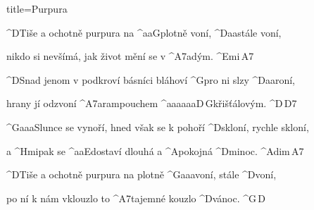 \begin{song}{title=\predtitle\centering Purpura \\\large   \vspace*{-0.3cm}}  %
\begin{centerjustified}
\nejnejvetsi

\sloka
	^{D}Tiše a ochotně purpura na ^{{\color{white}aa}G}plotně voní, ^{D{\color{white}aa}}stále voní,

	nikdo si nevšímá, jak život mění se v ^{A7{\color{white}a}}dým. ^{Emi\,A7}

\sloka
	^{D}Snad jenom v podkroví básníci bláhoví ^{G}pro ni slzy ^{D{\color{white}aa}}roní,

	hrany jí odzvoní ^{A7{\color{white}a}}rampouchem ^{{\color{white}aaaaaa}D\,G}křišťálovým. ^{D\,D7}

\sloka
	^{G{\color{white}aaa}}Slunce se vynoří, hned však se k pohoří ^{D}skloní, rychle skloní,

	a ^{Hmi}pak se ^{{\color{white}aa}E}dostaví dlouhá a ^{A}pokojná ^{Dmi}noc. ^{Adim\,A7}

\sloka
	^{D}Tiše a ochotně purpura na plotně ^{G{\color{white}aaa}}voní, stále ^{D}voní,

	po ní k nám vklouzlo to ^{A7}tajemné kouzlo ^{D}vánoc. ^{G\,D}


\end{centerjustified}
\setcounter{Slokočet}{0}
\end{song}

